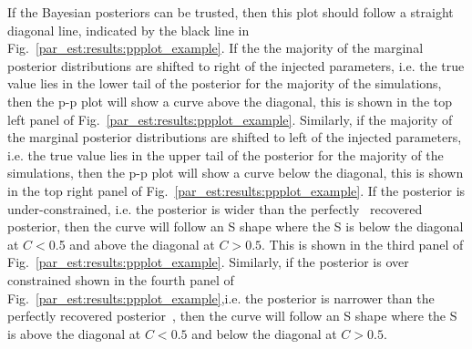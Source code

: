 If the Bayesian posteriors can be trusted, then this plot should follow a straight
diagonal line, indicated by the black line in
Fig.~\ref{par_est:results:ppplot_example}.  If the the majority of the marginal posterior
distributions are shifted to right of the injected parameters, i.e. the true value lies in
the lower tail of the posterior for the majority of the simulations, then the p-p plot will show a curve above
the diagonal, this is shown in the top left
panel of Fig.~\ref{par_est:results:ppplot_example}.  Similarly, if the majority of the marginal posterior distributions are shifted to
left of the injected parameters, i.e. the true value
lies in the upper tail of the posterior for the majority of the simulations,
then the p-p plot will show a curve below the diagonal, this is shown in the
top right panel of Fig.~\ref{par_est:results:ppplot_example}.  If the posterior is
under-constrained, i.e. the posterior is wider than the
perfectly~ recovered posterior, then the curve will follow an S shape
where the S is below the diagonal at $C < 0$.5 and above the diagonal at $C >
0.5$. This is shown in the third panel of
Fig.~\ref{par_est:results:ppplot_example}.  Similarly, if the posterior is over constrained shown in the fourth
panel of Fig.~\ref{par_est:results:ppplot_example},i.e. the posterior is
narrower than the perfectly recovered posterior~, then the curve will follow an S shape where the S is
above the diagonal at $C < 0.5$ and below the diagonal at $C> 0.5$.~
%

